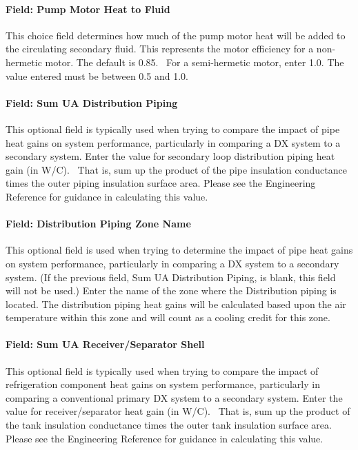 \paragraph{Field: Pump Motor Heat to Fluid}\label{field-pump-motor-heat-to-fluid}

This choice field determines how much of the pump motor heat will be added to the circulating secondary fluid. This represents the motor efficiency for a non-hermetic motor. The default is 0.85.~ For a semi-hermetic motor, enter 1.0. The value entered must be between 0.5 and 1.0.

\paragraph{Field: Sum UA Distribution Piping}\label{field-sum-ua-distribution-piping}

This optional field is typically used when trying to compare the impact of pipe heat gains on system performance, particularly in comparing a DX system to a secondary system. Enter the value for secondary loop distribution piping heat gain (in W/C).~ That is, sum up the product of the pipe insulation conductance times the outer piping insulation surface area. Please see the Engineering Reference for guidance in calculating this value.

\paragraph{Field: Distribution Piping Zone Name}\label{field-distribution-piping-zone-name}

This optional field is used when trying to determine the impact of pipe heat gains on system performance, particularly in comparing a DX system to a secondary system. (If the previous field, Sum UA Distribution Piping, is blank, this field will not be used.) Enter the name of the zone where the Distribution piping is located. The distribution piping heat gains will be calculated based upon the air temperature within this zone and will count as a cooling credit for this zone.

\paragraph{Field: Sum UA Receiver/Separator Shell}\label{field-sum-ua-receiverseparator-shell}

This optional field is typically used when trying to compare the impact of refrigeration component heat gains on system performance, particularly in comparing a conventional primary DX system to a secondary system. Enter the value for receiver/separator heat gain (in W/C).~ That is, sum up the product of the tank insulation conductance times the outer tank insulation surface area. Please see the Engineering Reference for guidance in calculating this value.

